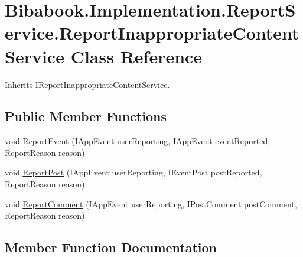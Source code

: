 \hypertarget{class_bibabook_1_1_implementation_1_1_report_service_1_1_report_inappropriate_content_service}{}\section{Bibabook.\+Implementation.\+Report\+Service.\+Report\+Inappropriate\+Content\+Service Class Reference}
\label{class_bibabook_1_1_implementation_1_1_report_service_1_1_report_inappropriate_content_service}


Inherits I\+Report\+Inappropriate\+Content\+Service.

\subsection*{Public Member Functions}
\begin{DoxyCompactItemize}
\item 
void \hyperlink{class_bibabook_1_1_implementation_1_1_report_service_1_1_report_inappropriate_content_service_a982d00d4c303fa7dbb15e456bad5da38}{Report\+Event} (I\+App\+Event user\+Reporting, I\+App\+Event event\+Reported, Report\+Reason reason)
\item 
void \hyperlink{class_bibabook_1_1_implementation_1_1_report_service_1_1_report_inappropriate_content_service_af3a633a947cc6ad5ce342e4687235dbd}{Report\+Post} (I\+App\+Event user\+Reporting, I\+Event\+Post post\+Reported, Report\+Reason reason)
\item 
void \hyperlink{class_bibabook_1_1_implementation_1_1_report_service_1_1_report_inappropriate_content_service_a74b76271113ba71fee324a2903942061}{Report\+Comment} (I\+App\+Event user\+Reporting, I\+Post\+Comment post\+Comment, Report\+Reason reason)
\end{DoxyCompactItemize}


\subsection{Member Function Documentation}
\hypertarget{class_bibabook_1_1_implementation_1_1_report_service_1_1_report_inappropriate_content_service_a74b76271113ba71fee324a2903942061}{}
